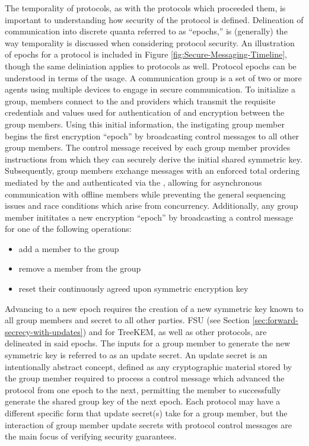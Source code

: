 The temporality of  protocols, as with the  protocols which proceeded them, is important to understanding how security of the protocol is defined.
Delineation of communication into discrete quanta referred to as ``epochs,'' is (generally) the way temporality is discussed when considering protocol security.
An illustration of epochs for a  protocol is included in Figure \ref{fig:Secure-Messaging-Timeline}, though the same deliniation applies to  protocols as well.
Protocol epochs can be understood in terms of the  usage.
A communication group is a set of two or more agents using multiple devices to engage in secure communication.
To initialize a group, members connect to the  and  providers which transmit the requisite credentials and values used for authentication of and encryption between the group members.
Using this initial information, the instigating group member begins the first encryption ``epoch'' by broadcasting control messages to all other group members.
The control message received by each group member provides instructions from which they can securely derive the initial shared symmetric key.
Subsequently, group members exchange messages with an enforced total ordering \autocite{halmos1960naive} mediated by the  and authenticated via the , allowing for asynchronous communication with offline members while preventing the general sequencing issues and race conditions which arise from concurrency.
Additionally, any group member inititates a new encryption ``epoch'' by broadcasting a control message for one of the following operations:

\begin{itemize}
  \item add a member to the group
  \item remove a member from the group
  \item reset their continuously agreed upon symmetric encryption key
\end{itemize}

Advancing to a new epoch requires the creation of a new symmetric key known to all group members and secret to all other parties.
FSU (see Section \ref{sec:forward-secrecy-with-updates}) and  for TreeKEM, as well as other  protocols, are delineated in said epochs.
The inputs for a group member to generate the new symmetric key is referred to as an update secret.
An update secret is an intentionally abstract concept, defined as any cryptographic material stored by the group member required to process a control message which advanced the protocol from one epoch to the next, permitting the member to successfully generate the shared group key of the next epoch.
Each protocol may have a different specific form that update secret(s) take for a group member, but the interaction of group member update secrets with protocol control messages are the main focus of verifying security guarantees.


